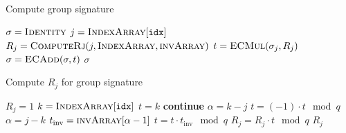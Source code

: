 \begin{algorithm}[p]
\caption{Compute group signature}
\label{alg:compute_grpsig}
\begin{algorithmic}[1]
    \State $\sigma = \textsc{Identity}$
        \State $j = \textsc{IndexArray}[\texttt{idx}]$
        \State $R_{j} = \textsc{ComputeRj}(j, \textsc{IndexArray},
            \textsc{invArray})$
        \State $t = \textsc{ECMul}(\sigma_{j}, R_{j})$
        \State $\sigma = \textsc{ECAdd}(\sigma,t)$
    \EndFor
    \State \Return $\sigma$
\EndFunction
\end{algorithmic}
\end{algorithm}

\begin{algorithm}[p]
\caption{Compute $R_{j}$ for group signature}
\label{alg:grpsig_compute_Rj}
\begin{algorithmic}[1]
    \State $R_{j} = 1$
        \State $k = \textsc{IndexArray}[\texttt{idx}]$
        \State $t = k$
            \State \textbf{continue}
            \State $\alpha = k - j$
        \Else
            \State $t = (-1)\cdot t \mod q$
            \State $\alpha = j - k$
        \EndIf
        \State $t_{\text{inv}} = \textsc{invArray}[\alpha-1]$
        \State $t = t\cdot t_{\text{inv}} \mod q$
        \State $R_{j} = R_{j}\cdot t \mod q$
    \EndFor
    \State \Return $R_{j}$
\EndFunction
\end{algorithmic}
\end{algorithm}
